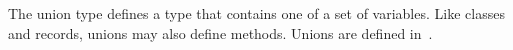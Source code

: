 The union type defines a type that contains one of a set of variables.
Like classes and records, unions may also define methods.  Unions are
defined in~.
